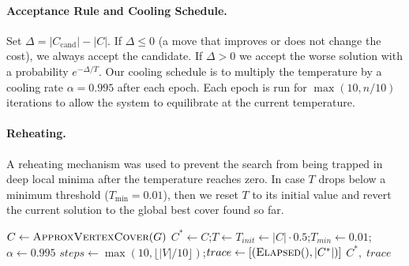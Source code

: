 \documentclass[sigconf]{acmart}
\begin{document}
\paragraph{Acceptance Rule and Cooling Schedule.}
Set $\Delta = |C_{\text{cand}}| - |C|$. If $\Delta \le 0$ (a move that improves or does not change the cost), we always accept the candidate. If $\Delta > 0$ we accept the worse solution with a probability $e^{-\Delta / T}$.
Our cooling schedule is to multiply the temperature by a cooling rate $ \alpha = 0.995 $ after each epoch. Each epoch is run for $\max(10,n/10)$ iterations to allow the system to equilibrate at the current temperature.

\paragraph{Reheating.}
A reheating mechanism was used to prevent the search from being trapped in deep local minima after the temperature reaches zero. In case $T$ drops below a minimum threshold ($T_{\min} = 0.01$), then we reset $T$ to its initial value and revert the current solution to the global best cover found so far.

\begin{algorithm}[t]
  \SetAlgoLined
  \DontPrintSemicolon
  $C \leftarrow \textsc{ApproxVertexCover}(G)$\;
  $C^* \leftarrow C$;\quad $T \leftarrow T_{init} \leftarrow |C| \cdot 0.5$;\quad $T_{min} \leftarrow 0.01$;\quad $\alpha \leftarrow 0.995$\;
  $steps \leftarrow \max(10, \lfloor |V|/10 \rfloor)$;\quad $trace \leftarrow [(\textsc{Elapsed}(), |C^*|)]$\;
  \Return $C^*,\; trace$\;
  \BlankLine
  \caption{Simulated Annealing for MVC.}
  \label{alg:ls1}
\end{algorithm}
\end{document}
